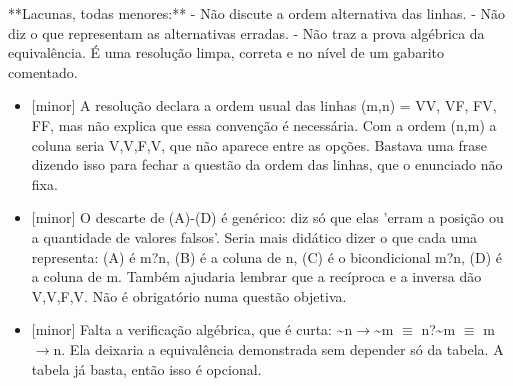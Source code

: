 \documentclass{article}%
\begin{document}
**Lacunas, todas menores:**\newline%
{-} Não discute a ordem alternativa das linhas.\newline%
{-} Não diz o que representam as alternativas erradas.\newline%
{-} Não traz a prova algébrica da equivalência.\newline%
\newline%
É uma resolução limpa, correta e no nível de um gabarito comentado.%
\begin{itemize}%
\item%
{[}minor{]} A resolução declara a ordem usual das linhas (m,n) = VV, VF, FV, FF, mas não explica que essa convenção é necessária. Com a ordem (n,m) a coluna seria V,V,F,V, que não aparece entre as opções. Bastava uma frase dizendo isso para fechar a questão da ordem das linhas, que o enunciado não fixa.%
\item%
{[}minor{]} O descarte de (A){-}(D) é genérico: diz só que elas 'erram a posição ou a quantidade de valores falsos'. Seria mais didático dizer o que cada uma representa: (A) é m?n, (B) é a coluna de n, (C) é o bicondicional m?n, (D) é a coluna de m. Também ajudaria lembrar que a recíproca e a inversa dão V,V,F,V. Não é obrigatório numa questão objetiva.%
\item%
{[}minor{]} Falta a verificação algébrica, que é curta: \textasciitilde{}n$\to$\textasciitilde{}m $\equiv$ n?\textasciitilde{}m $\equiv$ m$\to$n. Ela deixaria a equivalência demonstrada sem depender só da tabela. A tabela já basta, então isso é opcional.%
\end{itemize}%
\end{document}
